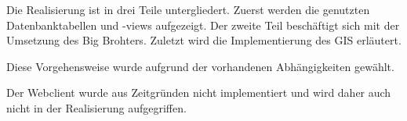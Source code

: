Die Realisierung ist in drei Teile untergliedert. Zuerst werden die genutzten Datenbanktabellen und -views aufgezeigt. Der zweite Teil beschäftigt sich mit der Umsetzung des Big Brohters. Zuletzt wird die Implementierung des GIS erläutert.

Diese Vorgehensweise wurde aufgrund der vorhandenen Abhängigkeiten gewählt.

Der Webclient wurde aus Zeitgründen nicht implementiert und wird daher auch nicht in der Realisierung aufgegriffen.